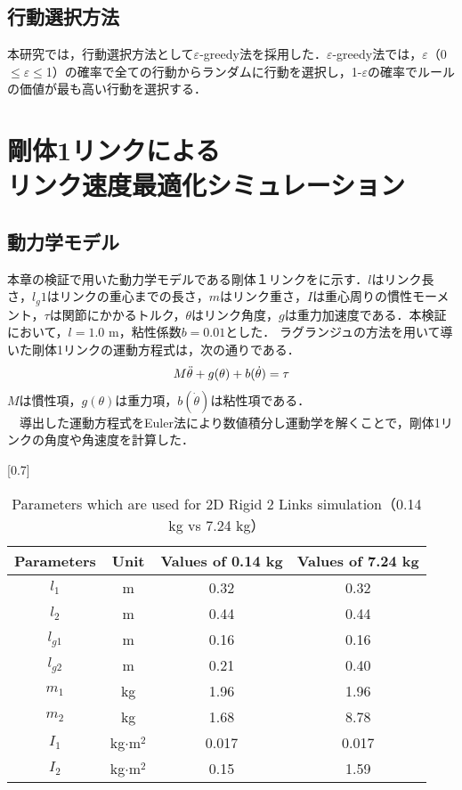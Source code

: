 \begin{small}
\subsection{行動選択方法}
本研究では，行動選択方法として$\varepsilon$-greedy法\cite{greedy}を採用した．$\varepsilon$-greedy法では，$\varepsilon$（0$\leq$$\varepsilon$$\leq$1）の確率で全ての行動からランダムに行動を選択し，1-$\varepsilon$の確率でルールの価値が最も高い行動を選択する．\\
\section{剛体1リンクによる\\リンク速度最適化シミュレーション}
\subsection{動力学モデル}
本章の検証で用いた動力学モデルである剛体１リンクをに示す．$l$はリンク長さ，$l_g{1}$はリンクの重心までの長さ，$m$はリンク重さ，$I$は重心周りの慣性モーメント，$\tau$は関節にかかるトルク，$\theta$はリンク角度，$g$は重力加速度である．本検証において，$l=1.0$ m，粘性係数$b=0.01$とした．
ラグランジュの方法\cite{lagrange}を用いて導いた剛体1リンクの運動方程式は，次の通りである．
\begin{eqnarray}
  \equlabel{2}
  M\ddot{\theta} + g(\theta) + b(\dot{\theta}) = \tau
\end{eqnarray}
$M$は慣性項，$g(\theta)$は重力項，$b(\dot{\theta})$は粘性項である．\\
　導出した運動方程式をEuler法\cite{euler}により数値積分し運動学を解くことで，剛体1リンクの角度や角速度を計算した．
\begin{table}[t]
  \begin{center}
    \caption{Parameters which are used for 2D Rigid 2 Links simulation（0.14 kg vs 7.24 kg）}
    \scalebox{0.7}[0.7]{
    \begin{tabular}{c|c|c|c}
      \hline
      Parameters & Unit & Values of 0.14 kg & Values of 7.24 kg \\
      \hline
      $l_{1}$ & m & 0.32 & 0.32\\
      $l_{2}$ & m & 0.44 & 0.44\\
      $l_{g1}$ & m & 0.16 & 0.16 \\
      $l_{g2}$ & m & 0.21 & 0.40 \\
      $m_{1}$ & kg & 1.96 & 1.96\\
      $m_{2}$ & kg & 1.68 & 8.78 \\
      $I_{1}$ & kg$\cdot$$\mathrm{m}^2$ & 0.017 & 0.017 \\
      $I_{2}$ & kg$\cdot$$\mathrm{m}^2$ & 0.15 & 1.59 \\
      \hline
    \end{tabular}
    }
  \end{center}
\end{table}

\end{small}
